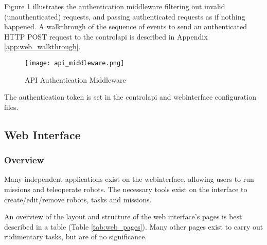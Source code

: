 Figure \ref{fig:api-auth-middleware} illustrates the authentication middleware filtering out invalid (unauthenticated) requests, and passing authenticated requests as if nothing happened. A walkthrough of the sequence of events to send an authenticated \gls{HTTP} \gls{POST} request to the \gls{controlapi} is described in Appendix \ref{app:web_walkthrough}.

\begin{figure}[!htb]
\begin{center}
\texttt{[image: api\_middleware.png]}
\end{center}
\caption{API Authentication Middleware}
\label{fig:api-auth-middleware}
\end{figure}

The authentication token is set in the \gls{controlapi} and \gls{webinterface} configuration files.

\subsection{Web Interface}

\subsubsection{Overview}
Many independent applications exist on the \gls{webinterface}, allowing users to run missions and teleoperate robots. The necessary tools exist on the interface to create/edit/remove robots, tasks and missions.

An overview of the layout and structure of the web interface's pages is best described in a table (Table \ref{tab:web_pages}). Many other pages exist to carry out rudimentary tasks, but are of no significance.

